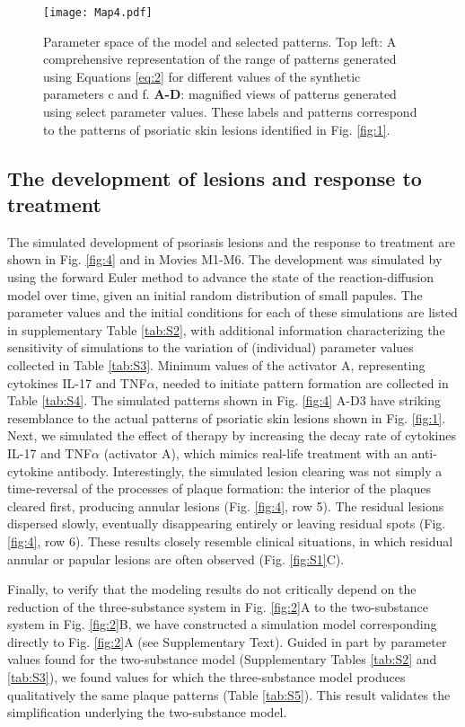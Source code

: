 \begin{figure}[ht]
	\centering
	\texttt{[image: Map4.pdf]}
	\caption{Parameter space of the model and selected patterns. Top left: A comprehensive representation of the range of patterns generated using Equations \ref{eq:2} for different values of the synthetic parameters c and f. \textbf{A-D}: magnified views of patterns generated using select parameter values. These labels and patterns correspond to the patterns of psoriatic skin lesions identified in Fig. \ref{fig:1}.}
	\label{fig:3}
\end{figure}

\subsection{The development of lesions and response to treatment}
The simulated development of psoriasis lesions and the response to treatment are shown in Fig. \ref{fig:4} and in Movies M1-M6. The development was simulated by using the forward Euler method to advance the state of the reaction-diffusion model over time, given an initial random distribution of small papules. The parameter values and the initial conditions for each of these simulations are listed in supplementary Table \ref{tab:S2}, with additional information characterizing the sensitivity of simulations to the variation of (individual) parameter values collected in Table \ref{tab:S3}. Minimum values of the activator A, representing cytokines IL-17 and TNF$\alpha$, needed to initiate pattern formation are collected in Table \ref{tab:S4}. The simulated patterns shown in Fig. \ref{fig:4} A-D3 have striking resemblance to the actual patterns of psoriatic skin lesions shown in Fig. \ref{fig:1}. Next, we simulated the effect of therapy by increasing the decay rate of cytokines IL-17 and TNF$\alpha$ (activator A), which mimics real-life treatment with an anti-cytokine antibody. Interestingly, the simulated lesion clearing was not simply a time-reversal of the processes of plaque formation: the interior of the plaques cleared first, producing annular lesions (Fig. \ref{fig:4}, row 5). The residual lesions dispersed slowly, eventually disappearing entirely or leaving residual spots (Fig. \ref{fig:4}, row 6). These results closely resemble clinical situations, in which residual annular or papular lesions are often observed (Fig. \ref{fig:S1}C). 

Finally, to verify that the modeling results do not critically depend on the reduction of the three-substance system in Fig. \ref{fig:2}A to the two-substance system in Fig. \ref{fig:2}B, we have constructed a simulation model corresponding directly to Fig. \ref{fig:2}A (see Supplementary Text). Guided in part by parameter values found for the two-substance model (Supplementary Tables \ref{tab:S2} and \ref{tab:S3}), we found values for which the three-substance model produces qualitatively the same plaque patterns (Table \ref{tab:S5}). This result validates the simplification underlying the two-substance model.

